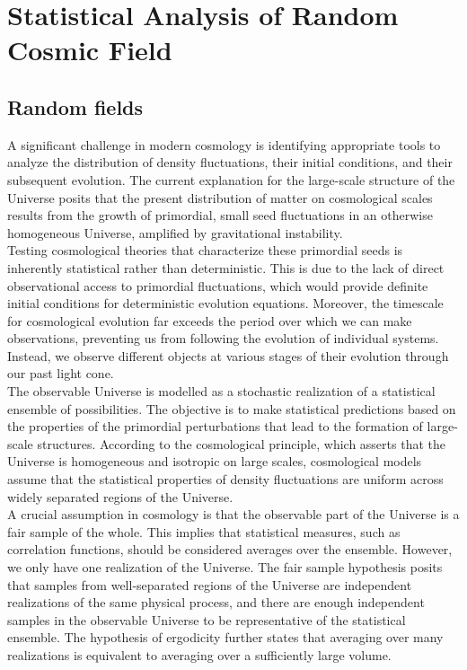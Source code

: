 \chapter{Statistical Analysis of Random Cosmic Field}\label{stats}
\justifying
\section{Random fields} \label{section 3.1}
A significant challenge in modern cosmology is identifying appropriate tools to analyze the distribution of density fluctuations, their initial conditions, and their subsequent evolution. The current explanation for the large-scale structure of the Universe posits that the present distribution of matter on cosmological scales results from the growth of primordial, small seed fluctuations in an otherwise homogeneous Universe, amplified by gravitational instability.\\

Testing cosmological theories that characterize these primordial seeds is inherently statistical rather than deterministic. This is due to the lack of direct observational access to primordial fluctuations, which would provide definite initial conditions for deterministic evolution equations. Moreover, the timescale for cosmological evolution far exceeds the period over which we can make observations, preventing us from following the evolution of individual systems. Instead, we observe different objects at various stages of their evolution through our past light cone.\\

The observable Universe is modelled as a stochastic realization of a statistical ensemble of possibilities. The objective is to make statistical predictions based on the properties of the primordial perturbations that lead to the formation of large-scale structures. According to the cosmological principle, which asserts that the Universe is homogeneous and isotropic on large scales, cosmological models assume that the statistical properties of density fluctuations are uniform across widely separated regions of the Universe.\\

A crucial assumption in cosmology is that the observable part of the Universe is a fair sample of the whole. This implies that statistical measures, such as correlation functions, should be considered averages over the ensemble. However, we only have one realization of the Universe. The fair sample hypothesis posits that samples from well-separated regions of the Universe are independent realizations of the same physical process, and there are enough independent samples in the observable Universe to be representative of the statistical ensemble. The hypothesis of ergodicity further states that averaging over many realizations is equivalent to averaging over a sufficiently large volume. \cite{verde2008practicalguidebasicstatistical}\cite{Bernardeau_2002}\\


